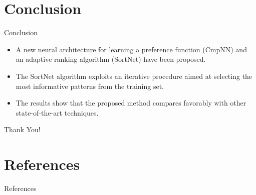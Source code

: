 \documentclass[8pt]{beamer}
\renewcommand{\|}[1][.3em]{\hspace{#1}|\hspace{#1}}
\renewcommand{\,}[1][.3em]{,\hspace{#1}}
\newlength{\wideitemsep}
\let\olditem\item
\renewcommand{\item}{\setlength{\itemsep}{\wideitemsep}\olditem}
\renewcommand{\,}{,\hspace{3pt}}
\renewcommand{\|}{\hspace{3pt}|\hspace{3pt}}
\begin{document}
\section{Conclusion}
\begin{frame}{Conclusion}
    \begin{itemize}
    \item A new neural architecture for learning a preference function (CmpNN) and an adaptive ranking algorithm (SortNet) have been proposed.
    \item The SortNet algorithm exploits an iterative procedure aimed at selecting the most informative patterns from the training set. 
    \item The results show that the proposed method compares favorably with other state-of-the-art techniques.
    \end{itemize}
\end{frame}

\begin{frame}{}
    \begin{center}
    \vspace{5em}
    {\fontsize{20}{50}\selectfont Thank You!}
    \end{center}
\end{frame}

\section{References}
\begin{frame}{References}
    \nocite{*}
    {\scriptsize
    
    
    }
\end{frame}

\appendix
\end{document}

